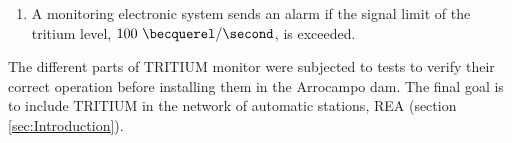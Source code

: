 \begin{enumerate}
\item{} A monitoring electronic system sends an alarm if the signal limit of the tritium level, $100~\becquerel/\second$, is exceeded.

\end{enumerate}

The different parts of TRITIUM monitor were subjected to tests to verify their correct operation before installing them in the Arrocampo dam. The final goal is to include TRITIUM in the network of automatic stations, REA (section \ref{sec:Introduction}).
